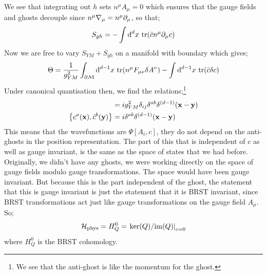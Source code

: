 We see that integrating out $h$ sets $n^{\mu}A_\mu = 0$ which ensures that the gauge fields and ghosts decouple since $n^{\mu}\nabla_\mu = n^{\mu}\partial_\mu$, so that;
\begin{equation*}
S_{gh} = -\int{\text{d}^d x \,\tr(\bar{c}n^\mu \partial_\mu c)}
\end{equation*}
Now we are free to vary $S_{YM} + S_{gh}$ on a manifold with boundary which gives;
\begin{equation}
\Theta = \frac{1}{g^2_{YM}}\int_{\partial \mathcal{M}}{\text{d}^{d - 1}x \,\tr(n^\mu F_{\mu\nu}\delta A^{\nu})} - \int{\text{d}^{d - 1}x \,\tr(\bar{c} \delta c)}
\end{equation}
Under canonical quantisation then, we find the relations;\footnote{We see that the anti-ghost is like the momentum for the ghost.}
\begin{align*}
[A_i^a(\vec{x}), E_j^{b}(\vec{y})] &= ig_{YM}^2\delta_{ij}\delta^{ab}\delta^{(d - 1)}(\vec{x} - \vec{y}) \\
\set{c^a(\vec{x}), \bar{c}^{b}(\vec{y})} &= i\delta^{ab}\delta^{(d - 1)}(\vec{x} - \vec{y})
\end{align*}
This means that the wavefunctions are $\Psi[A_i, c]$, they do not depend on the anti-ghosts in the position representation. The part of this that is independent of $c$ as well as gauge invariant, is the same as the space of states that we had before. Originally, we didn't have any ghosts, we were working directly on the space of gauge fields modulo gauge transformations. The space would have been gauge invariant.  But because this is the part independent of the ghost, the statement that this is gauge invariant is just the statement that it is BRST invariant, since BRST transformations act just like gauge transformations on the gauge field $A_\mu$. So;
\begin{equation*}
\hamilt_{\text{phys}} = H_Q^0 = \left.\text{ker}(Q)/\text{im}(Q)\right|_{c = 0}
\end{equation*}
where $H_Q^{0}$ is the BRST cohomology.
